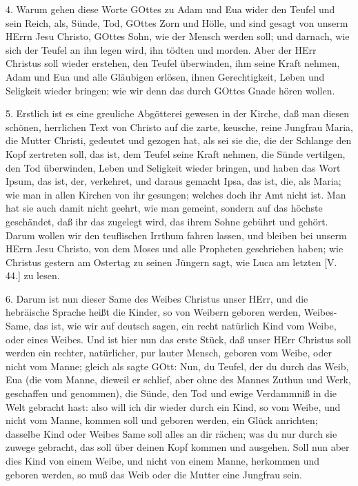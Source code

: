 4. Warum gehen diese Worte GOttes zu Adam und Eua wider den Teufel und sein Reich, als, Sünde, Tod, GOttes Zorn und Hölle, und sind gesagt von unserm HErrn Jesu Christo, GOttes Sohn, wie der Mensch werden soll; und darnach, wie sich der Teufel an ihn legen wird, ihn tödten und morden. Aber der HErr Christus soll wieder erstehen, den Teufel überwinden, ihm seine Kraft nehmen, Adam und Eua und alle Gläubigen erlösen, ihnen Gerechtigkeit, Leben und Seligkeit wieder bringen; wie wir denn das durch GOttes Gnade hören wollen.

5. Erstlich ist es eine greuliche Abgötterei gewesen in der Kirche, daß man diesen schönen, herrlichen Text von Christo auf die zarte, keusche, reine Jungfrau Maria, die Mutter Christi, gedeutet und gezogen hat, als sei sie die, die der Schlange den Kopf zertreten soll, das ist, dem Teufel seine Kraft nehmen, die Sünde vertilgen, den Tod überwinden, Leben und Seligkeit wieder bringen, und haben das Wort Ipsum, das ist, der, verkehret, und daraus gemacht Ipsa, das ist, die, als Maria; wie man in allen Kirchen von ihr gesungen; welches doch ihr Amt nicht ist. Man hat sie auch damit nicht geehrt, wie man gemeint, sondern auf das höchste geschändet, daß ihr das zugelegt wird, das ihrem Sohne gebührt und gehört. Darum wollen wir den teuflischen Irrthum fahren lassen, und bleiben bei unserm HErrn Jesu Christo, von dem Moses und alle Propheten geschrieben haben; wie Christus gestern am Ostertag zu seinen Jüngern sagt, wie Luca am letzten [V. 44.] zu lesen.

6. Darum ist nun dieser Same des Weibes Christus unser HErr, und die hebräische Sprache heißt die Kinder, so von Weibern geboren werden, Weibes-Same, das ist, wie wir auf deutsch sagen, ein recht natürlich Kind vom Weibe, oder eines Weibes. Und ist hier nun das erste Stück, daß unser HErr Christus soll werden ein rechter, natürlicher, pur lauter Mensch, geboren vom Weibe, oder nicht vom Manne; gleich als sagte GOtt: Nun, du Teufel, der du durch das Weib, Eua (die vom Manne, dieweil er schlief, aber ohne des Mannes Zuthun und Werk, geschaffen und genommen), die Sünde, den Tod und ewige Verdammniß in die Welt gebracht hast: also will ich dir wieder durch ein Kind, so vom Weibe, und nicht vom Manne, kommen soll und geboren werden, ein Glück anrichten; dasselbe Kind oder Weibes Same soll alles an dir rächen; was du nur durch sie zuwege gebracht, das soll über deinen Kopf kommen und ausgehen. Soll nun aber dies Kind von einem Weibe, und nicht von einem Manne, herkommen und geboren werden, so muß das Weib oder die Mutter eine Jungfrau sein.

